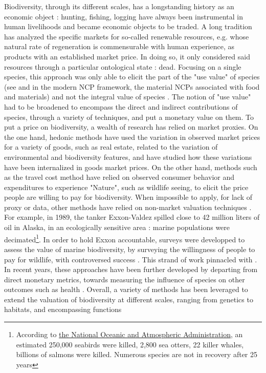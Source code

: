 Biodiversity, through its different scales, has a longstanding history as an economic object : hunting, fishing, logging have always been instrumental in human livelihoods and became economic objects to be traded. A long tradition has analyzed the specific markets for so-called renewable resources, e.g. whose natural rate of regeneration is commensurable with human experience, as products with an established market price. In doing so, it only considered said resources through a particular ontological state : dead. Focusing on a single species, this approach was only able to elicit the part of the "use value" of species (see \cite{Krutilla1967} and in the modern NCP framework, the material NCPs associated with food and materials) and not the integral value of species \citep{Krutilla1967}. The notion of "use value" had to be broadened to encompass the direct and indirect contributions of species, through a variety of techniques, and put a monetary value on them. To put a price on biodiversity, a wealth of research has relied on market proxies. On the one hand, hedonic methods \citep{rosen_hedonic_1974} have used the variation in observed market prices for a variety of goods, such as real estate, related to the variation of environmental and biodiversity features, and have studied how these variations have been internalized in goods market prices. On the other hand, methods such as the travel cost method \citep{clawson_economics_1967, bhandari_willingness_2010} have relied on observed consumer behavior and expenditures to experience "Nature", such as wildlife seeing, to elicit the price people are willing to pay for biodiversity. When impossible to apply, for lack of proxy or data, other methods have relied on non-market valuation techniques \citep{carson_contingent_2012}. For example, in 1989, the tanker Exxon-Valdez spilled close to 42 million liters of oil in Alaska, in an ecologically sensitive area : marine populations were decimated\footnote{According to \href{https://darrp.noaa.gov/oil-spills/exxon-valdez}{the National Oceanic and Atmospheric Administration}, an estimated 250,000 seabirds were killed, 2,800 sea otters, 22 killer whales, billions of salmons were killed. Numerous species are not in recovery after 25 years}. In order to hold Exxon accountable, surveys were developped to assess the value of marine biodiversity, by surveying the willingness of people to pay for wildlife\citep{carson_contingent_1992, arrow_report_1993, carson_contingent_2003}, with controversed success \citep{Diamond94}. This strand of work pinnacled with \cite{Costanza1997}. In recent years, these approaches have been further developed by departing from direct monetary metrics, towards measuring the influence of species on other outcomes such as health \citep{frank_social_nodate,frank_economic_2024}. Overall, a variety of methods has been leveraged to extend the valuation of biodiversity at different scales, ranging from genetics to habitats, and encompassing functions \citep{bartkowski_capturing_2015}

